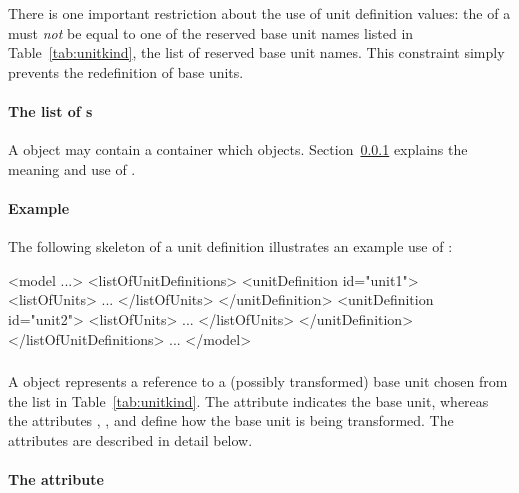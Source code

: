 There is one important restriction about the use of unit
definition  values: the  of a \UnitDefinition
must \emph{not} be equal to one of the reserved base unit
  names listed in Table~\ref{tab:unitkind}, the list of reserved
base unit names.  This constraint simply prevents the redefinition
of base units.


\paragraph{The list of s}
\label{sec:listofunits}

A \UnitDefinition object may contain a \ListOfUnits container which  \Unit objects. Section~\ref{sec:unit-structure} explains
the meaning and use of \Unit.   

\paragraph{Example}

The following skeleton of a unit definition illustrates an example
use of \UnitDefinition:

\begin{example}
<model ...>
    <listOfUnitDefinitions>
        <unitDefinition id="unit1">
            <listOfUnits>
                ...
            </listOfUnits>
        </unitDefinition>
        <unitDefinition id="unit2">
            <listOfUnits>
                ...
            </listOfUnits>
        </unitDefinition>
    </listOfUnitDefinitions>
    ...
</model>
\end{example}


\subsubsection{}
\label{sec:unit-structure}

A \Unit object represents a reference to a (possibly transformed)
base unit chosen from the list in Table~\vref{tab:unitkind}.  The
attribute  indicates the base unit, whereas the
attributes , , and 
define how the base unit is being transformed.  The attributes
are described in detail below.


\paragraph{The  attribute}

